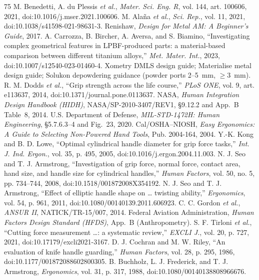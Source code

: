 \documentclass[10pt,journal,letterpaper]{IEEEtran}
\begin{document}
\begin{thebibliography}{75}
 M. Benedetti, A. du Plessis \emph{et al.}, \emph{Mater. Sci. Eng. R}, vol. 144, art. 100606, 2021, doi:10.1016/j.mser.2021.100606.
 M. Ala\~{n}a \emph{et al.}, \emph{Sci. Rep.}, vol. 11, 2021, doi:10.1038/s41598-021-98631-3.
 Renishaw, \emph{Design for Metal AM: A Beginner's Guide}, 2017.
 A. Carrozza, B. Bircher, A. Aversa, and S. Biamino, ``Investigating complex geometrical features in LPBF-produced parts: a material-based comparison between different titanium alloys,'' \emph{Met. Mater. Int.}, 2023, doi:10.1007/s12540-023-01460-4.
 Xometry DMLS design guide; Materialise metal design guide; Solukon depowdering guidance (powder ports 2--5~mm, $\ge 3$~mm).
 R. M. Dodds \emph{et al.}, ``Grip strength across the life course,'' \emph{PLoS ONE}, vol. 9, art. e113637, 2014, doi:10.1371/journal.pone.0113637.
 NASA, \emph{Human Integration Design Handbook (HIDH)}, NASA/SP-2010-3407/REV1, \S 9.12.2 and App.~B Table~8, 2014.
 U.S. Department of Defense, \emph{MIL-STD-1472H: Human Engineering}, \S 5.7.6.3--4 and Fig.~23, 2020.
 Cal/OSHA--NIOSH, \emph{Easy Ergonomics: A Guide to Selecting Non-Powered Hand Tools}, Pub. 2004-164, 2004.
 Y.-K. Kong and B. D. Lowe, ``Optimal cylindrical handle diameter for grip force tasks,'' \emph{Int. J. Ind. Ergon.}, vol. 35, p. 495, 2005, doi:10.1016/j.ergon.2004.11.003.
 N. J. Seo and T. J. Armstrong, ``Investigation of grip force, normal force, contact area, hand size, and handle size for cylindrical handles,'' \emph{Human Factors}, vol. 50, no. 5, pp. 734--744, 2008, doi:10.1518/001872008X354192.
 N. J. Seo and T. J. Armstrong, ``Effect of elliptic handle shape on \ldots{} twisting ability,'' \emph{Ergonomics}, vol. 54, p. 961, 2011, doi:10.1080/00140139.2011.606923.
 C. C. Gordon \emph{et al.}, \emph{ANSUR II}, NATICK/TR-15/007, 2014.
 Federal Aviation Administration, \emph{Human Factors Design Standard (HFDS)}, App.~B (Anthropometry).
 S. F. Tirloni \emph{et al.}, ``Cutting force measurement \ldots: a systematic review,'' \emph{EXCLI J.}, vol. 20, p. 727, 2021, doi:10.17179/excli2021-3167.
 D. J. Cochran and M. W. Riley, ``An evaluation of knife handle guarding,'' \emph{Human Factors}, vol. 28, p. 295, 1986, doi:10.1177/001872088602800305.
 B. Buchholz, L. J. Frederick, and T. J. Armstrong, \emph{Ergonomics}, vol. 31, p. 317, 1988, doi:10.1080/00140138808966676.

\end{thebibliography}
\end{document}
